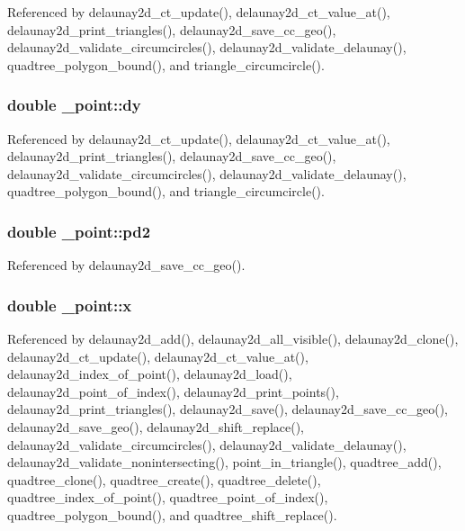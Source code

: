 Referenced by delaunay2d\+\_\+ct\+\_\+update(), delaunay2d\+\_\+ct\+\_\+value\+\_\+at(), delaunay2d\+\_\+print\+\_\+triangles(), delaunay2d\+\_\+save\+\_\+cc\+\_\+geo(), delaunay2d\+\_\+validate\+\_\+circumcircles(), delaunay2d\+\_\+validate\+\_\+delaunay(), quadtree\+\_\+polygon\+\_\+bound(), and triangle\+\_\+circumcircle().

\subsubsection[{\texorpdfstring{dy}{dy}}]{\setlength{\rightskip}{0pt plus 5cm}double \+\_\+point\+::dy}\hypertarget{struct__point_a16e8d47539ec8397986182aff29d782c}{}\label{struct__point_a16e8d47539ec8397986182aff29d782c}


Referenced by delaunay2d\+\_\+ct\+\_\+update(), delaunay2d\+\_\+ct\+\_\+value\+\_\+at(), delaunay2d\+\_\+print\+\_\+triangles(), delaunay2d\+\_\+save\+\_\+cc\+\_\+geo(), delaunay2d\+\_\+validate\+\_\+circumcircles(), delaunay2d\+\_\+validate\+\_\+delaunay(), quadtree\+\_\+polygon\+\_\+bound(), and triangle\+\_\+circumcircle().

\subsubsection[{\texorpdfstring{pd2}{pd2}}]{\setlength{\rightskip}{0pt plus 5cm}double \+\_\+point\+::pd2}\hypertarget{struct__point_aa9e4cda89ec0b5901ea974f41b80e7a5}{}\label{struct__point_aa9e4cda89ec0b5901ea974f41b80e7a5}


Referenced by delaunay2d\+\_\+save\+\_\+cc\+\_\+geo().

\subsubsection[{\texorpdfstring{x}{x}}]{\setlength{\rightskip}{0pt plus 5cm}double \+\_\+point\+::x}\hypertarget{struct__point_a513f6fe169c2cfdfa8bb88de0b803a88}{}\label{struct__point_a513f6fe169c2cfdfa8bb88de0b803a88}


Referenced by delaunay2d\+\_\+add(), delaunay2d\+\_\+all\+\_\+visible(), delaunay2d\+\_\+clone(), delaunay2d\+\_\+ct\+\_\+update(), delaunay2d\+\_\+ct\+\_\+value\+\_\+at(), delaunay2d\+\_\+index\+\_\+of\+\_\+point(), delaunay2d\+\_\+load(), delaunay2d\+\_\+point\+\_\+of\+\_\+index(), delaunay2d\+\_\+print\+\_\+points(), delaunay2d\+\_\+print\+\_\+triangles(), delaunay2d\+\_\+save(), delaunay2d\+\_\+save\+\_\+cc\+\_\+geo(), delaunay2d\+\_\+save\+\_\+geo(), delaunay2d\+\_\+shift\+\_\+replace(), delaunay2d\+\_\+validate\+\_\+circumcircles(), delaunay2d\+\_\+validate\+\_\+delaunay(), delaunay2d\+\_\+validate\+\_\+nonintersecting(), point\+\_\+in\+\_\+triangle(), quadtree\+\_\+add(), quadtree\+\_\+clone(), quadtree\+\_\+create(), quadtree\+\_\+delete(), quadtree\+\_\+index\+\_\+of\+\_\+point(), quadtree\+\_\+point\+\_\+of\+\_\+index(), quadtree\+\_\+polygon\+\_\+bound(), and quadtree\+\_\+shift\+\_\+replace().

